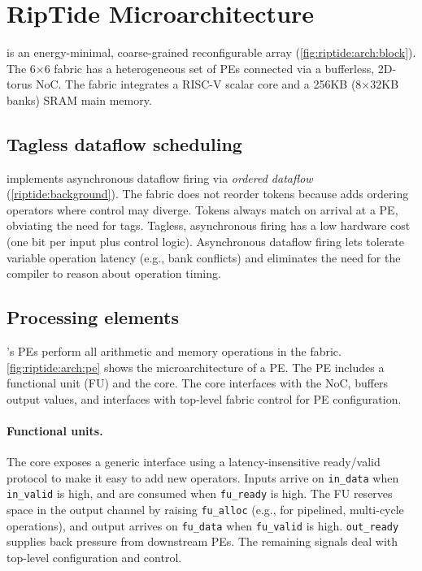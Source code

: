 \section{RipTide Microarchitecture}
\label{riptide:arch}

\riptide is an energy-minimal, \ulp coarse-grained reconfigurable array (\autoref{fig:riptide:arch:block}).
% 
The 6$\times$6 fabric has a
heterogeneous set of PEs connected via a bufferless, 2D-torus NoC.
% 
The fabric integrates a RISC-V scalar core and a 256KB
(8$\times$32KB banks) SRAM main memory.

\subsection{Tagless dataflow scheduling}

\riptide implements asynchronous dataflow firing via \emph{ordered dataflow} (\autoref{riptide:background}).
%
The fabric does not reorder tokens because \riptide adds ordering operators where
control may diverge.
%
Tokens always match on arrival at a PE, obviating the need for tags.
%
Tagless, asynchronous firing has a low hardware cost (one bit per input plus
control logic).
%
Asynchronous dataflow firing lets \riptide tolerate variable operation latency
(e.g., bank conflicts) and eliminates the need for the compiler to reason about
operation timing.

\subsection{Processing elements}
\riptide's PEs perform all arithmetic and memory operations in the fabric.
%
\autoref{fig:riptide:arch:pe} shows the microarchitecture of a PE.
% 
The PE includes a functional unit (FU) and the \textmu core.
% 
The \textmu core interfaces with the NoC, buffers
output values, and interfaces with top-level fabric control for PE configuration.

\paragraph{Functional units.}
The \textmu core exposes a generic interface using a
latency-insensitive ready/valid protocol to make it easy to add new
operators.
%
Inputs arrive on {\tt in\_data} when {\tt in\_valid} is high,
and are consumed when {\tt fu\_ready} is high.
%
The FU reserves space in the output channel by raising {\tt fu\_alloc}
(e.g., for pipelined, multi-cycle operations),
and output arrives on {\tt fu\_data} when {\tt fu\_valid} is high.
%
{\tt out\_ready} supplies back pressure from downstream PEs.
%
The remaining signals deal with top-level configuration and control.

